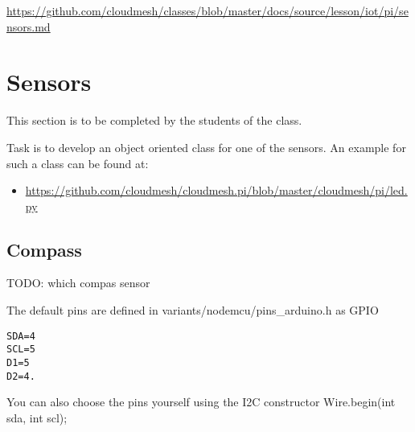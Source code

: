 \begin{fileremark}\url{https://github.com/cloudmesh/classes/blob/master/docs/source/lesson/iot/pi/sensors.md}\end{fileremark}
\section{Sensors}\label{sensors}

This section is to be completed by the students of the class.

Task is to develop an object oriented class for one of the sensors. An
example for such a class can be found at:

\begin{itemize}
\tightlist
\item
  \url{https://github.com/cloudmesh/cloudmesh.pi/blob/master/cloudmesh/pi/led.py}
\end{itemize}

\subsection{Compass}\label{compass}

TODO: which compas sensor

The default pins are defined in variants/nodemcu/pins\_arduino.h as GPIO

\begin{verbatim}
SDA=4 
SCL=5
D1=5 
D2=4.
\end{verbatim}

You can also choose the pins yourself using the I2C constructor
Wire.begin(int sda, int scl);
